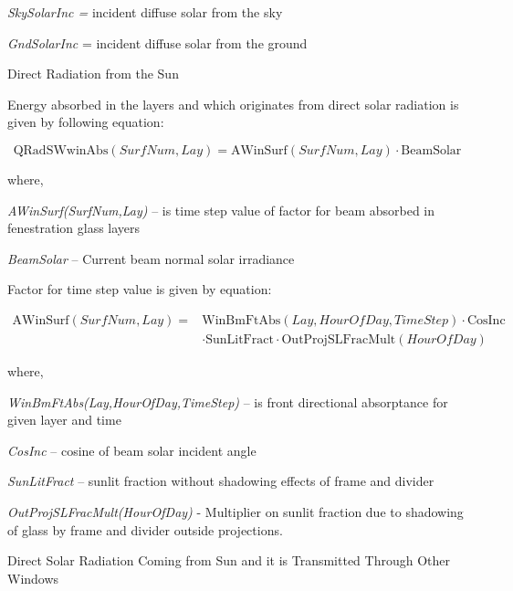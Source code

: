 \emph{SkySolarInc =} incident diffuse solar from the sky

\emph{GndSolarInc} = incident diffuse solar from the ground

Direct Radiation from the Sun

Energy absorbed in the layers and which originates from direct solar radiation is given by following equation:

\begin{equation}
\text{QRadSWwinAbs}(SurfNum, Lay) = \text{AWinSurf}(SurfNum, Lay) \cdot \text{BeamSolar}
\end{equation}

where,

\emph{AWinSurf(SurfNum,Lay)} -- is time step value of factor for beam absorbed in fenestration glass layers

\emph{BeamSolar} -- Current beam normal solar irradiance

Factor for time step value is given by equation:

\begin{equation}
\begin{split}
\text{AWinSurf}(SurfNum,Lay) =& \text{WinBmFtAbs}(Lay,HourOfDay,TimeStep) \cdot \text{CosInc} \\
&\cdot \text{SunLitFract} \cdot \text{OutProjSLFracMult}(HourOfDay)
\end{split}
\end{equation}

where,

\emph{WinBmFtAbs(Lay,HourOfDay,TimeStep)} -- is front directional absorptance for given layer and time

\emph{CosInc} -- cosine of beam solar incident angle

\emph{SunLitFract} -- sunlit fraction without shadowing effects of frame and divider

\emph{OutProjSLFracMult(HourOfDay)} - Multiplier on sunlit fraction due to shadowing of glass by frame and divider outside projections.

Direct Solar Radiation Coming from Sun and it is Transmitted Through Other Windows


